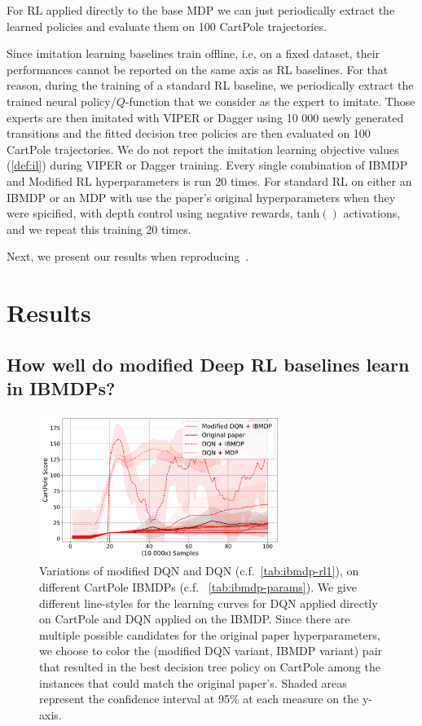 For RL applied directly to the base MDP we can just periodically extract the learned policies and evaluate them on 100 CartPole trajectories.

Since imitation learning baselines train offline, i.e, on a fixed dataset, their performances cannot be reported on the same axis as RL baselines.
For that reason, during the training of a standard RL baseline, we periodically extract the trained neural policy/$Q$-function that we consider as the expert to imitate.
Those experts are then imitated with VIPER or Dagger using 10 000 newly generated transitions and the fitted decision tree policies are then evaluated on 100 CartPole trajectories.
We do not report the imitation learning objective values (\ref{def:il}) during VIPER or Dagger training.
Every single combination of IBMDP and Modified RL hyperparameters is run 20 times.
For standard RL on either an IBMDP or an MDP with use the paper's original hyperparameters when they were spicified, with depth control using negative rewards, $\operatorname{tanh()}$ activations, and we repeat this training 20 times. 

Next, we present our results when reproducing~\cite[Table 1]{topin2021iterative}.

\section{Results}

\subsection{How well do modified Deep RL baselines learn in IBMDPs?}

\begin{figure}
    \centering
    \includegraphics[width=0.7\textwidth]{images/images_part1/dqn.pdf}
    \caption{Variations of modified DQN and DQN (c.f.~\ref{tab:ibmdp-rl1}), on different CartPole IBMDPs (c.f. ~\ref{tab:ibmdp-params}). We give different line-styles for the learning curves for DQN applied directly on CartPole and DQN applied on the IBMDP.
    Since there are multiple possible candidates for the original paper hyperparameters, we choose to color the (modified DQN variant, IBMDP variant) pair that resulted in the best decision tree policy on CartPole among the instances that could match the original paper's.
    Shaded areas represent the confidence interval at 95\% at each measure on the y-axis.}
\end{figure}\label{fig:res-dqn}

